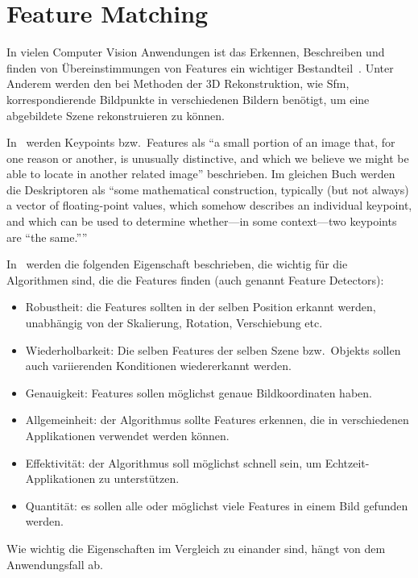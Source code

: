 \section{Feature Matching}
In vielen Computer Vision Anwendungen ist das Erkennen, Beschreiben und finden von Übereinstimmungen von Features ein wichtiger Bestandteil~\cite{hassaballah_2016}.
Unter Anderem werden den bei Methoden der 3D Rekonstruktion, wie Sfm, korrespondierende Bildpunkte in verschiedenen Bildern benötigt, um eine abgebildete Szene rekonstruieren zu können.

In~\cite[Kapitel 16]{kaehler_2016} werden Keypoints bzw.\ Features als \enquote{a small portion of an image that, for one reason or another, is unusually distinctive, and which we believe we might be
able to locate in another related image} beschrieben.
Im gleichen Buch werden die Deskriptoren als \enquote{some mathematical construction, typically (but not always) a vector of floating-point values, which somehow describes an individual keypoint, and which can be used to determine whether---in some context---two keypoints are ``the same.''}

In~\cite{hassaballah_2016} werden die folgenden Eigenschaft beschrieben, die wichtig für die Algorithmen sind, die die Features finden (auch genannt Feature Detectors):
\begin{itemize}
    \item Robustheit: die Features sollten in der selben Position erkannt werden, unabhängig von der Skalierung, Rotation, Verschiebung etc.
    \item Wiederholbarkeit: Die selben Features der selben Szene bzw.\ Objekts sollen auch variierenden Konditionen wiedererkannt werden.
    \item Genauigkeit: Features sollen möglichst genaue Bildkoordinaten haben.
    \item Allgemeinheit: der Algorithmus sollte Features erkennen, die in verschiedenen Applikationen verwendet werden können.
    \item Effektivität: der Algorithmus soll möglichst schnell sein, um Echtzeit-Applikationen zu unterstützen. 
    \item Quantität: es sollen alle oder möglichst viele Features in einem Bild gefunden werden.
\end{itemize}
Wie wichtig die Eigenschaften im Vergleich zu einander sind, hängt von dem Anwendungsfall ab.


